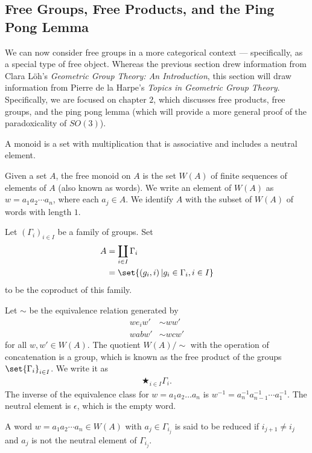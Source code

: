 \documentclass[10pt]{mypackage}
\begin{document}
\subsection{Free Groups, Free Products, and the Ping Pong Lemma}%
We can now consider free groups in a more categorical context --- specifically, as a special type of free object. Whereas the previous section drew information from Clara Löh's \textit{Geometric Group Theory: An Introduction}, this section will draw information from Pierre de la Harpe's \textit{Topics in Geometric Group Theory}. Specifically, we are focused on chapter $2$, which discusses free products, free groups, and the ping pong lemma (which will provide a more general proof of the paradoxicality of $SO(3)$).
\begin{definition}
  A monoid is a set with multiplication that is associative and includes a neutral element.\newline

  Given a set $A$, the free monoid on $A$ is the set $W(A)$ of finite sequences of elements of $A$ (also known as words). We write an element of $W(A)$ as $w = a_1a_2\cdots a_n$, where each $a_j\in A$. We identify $A$ with the subset of $W(A)$ of words with length $1$.
\end{definition}
\begin{definition}
  Let $\left(\Gamma_i\right)_{i\in I}$ be a family of groups. Set
  \begin{align*}
    A &= \coprod_{i\in I}\Gamma_{i}\\
      &= \set{\left(g_i,i\right) | g_i\in \Gamma_i,i\in I}
  \end{align*}
  to be the coproduct of this family.\newline

  Let $\sim$ be the equivalence relation generated by
  \begin{align*}
    we_i w' &\sim ww' \tag*{where $e_i\in \Gamma_i$ is the neutral element}\\
    wabw' &\sim wcw' \tag*{where $a,b,c\in \Gamma_i$, $c=ab$ for some $i\in I$}
  \end{align*}
  for all $w,w'\in W(A)$. The quotient $W(A)/\sim$ with the operation of concatenation is a group, which is known as the free product of the groups $\set{\Gamma_i}_{i\in I}$. We write it as
  \begin{align*}
    \bigstar_{i\in I} \Gamma_{i}.
  \end{align*}
  The inverse of the equivalence class for $w = a_1a_2\dots a_n$ is $w^{-1} = a_n^{-1}a_{n-1}^{-1}\cdots a_{1}^{-1}$. The neutral element is $\epsilon$, which is the empty word.\newline

  A word $w = a_1a_2\cdots a_n\in W(A)$ with $a_j\in \Gamma_{i_j}$ is said to be reduced if $i_{j + 1} \neq i_{j}$ and $a_j$ is not the neutral element of $\Gamma_{i_j}$.
\end{definition}
\end{document}
